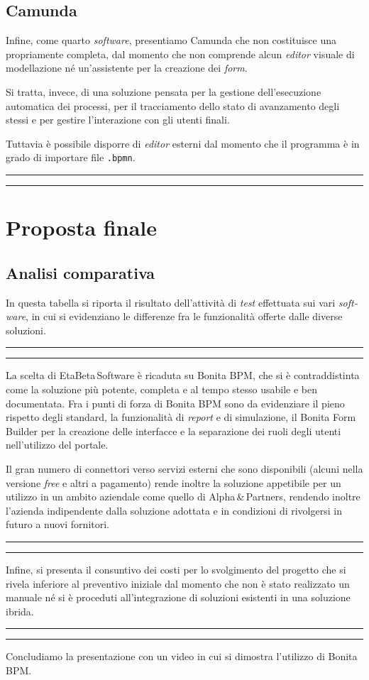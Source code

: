 \documentclass[a4paper,10pt]{article}
\newcommand{\inglese}[1]{\foreignlanguage{english}{\textit{#1}}}
\newcommand{\team}{\textsf{EtaBeta\,Software}\xspace}
\newcommand{\sw}{\inglese{software}\xspace}
\newcommand{\customer}{\textsf{Alpha\,\&\,Partners}\xspace}
\newcommand{\cambioslide}{%
\begin{center}
\Large
\rule[4pt]{0.2\linewidth}{.7pt} \ding{167} \rule[4pt]{0.2\linewidth}{.7pt}
\end{center}
}
\begin{document}
\subsection{Camunda}
Infine, come quarto \sw, presentiamo Camunda che non costituisce una propriamente completa, dal momento che non comprende alcun \inglese{editor} visuale di modellazione né un'assistente per la creazione dei \inglese{form}.

Si tratta, invece, di una soluzione pensata per la gestione dell'esecuzione automatica dei processi, per il tracciamento dello stato di avanzamento degli stessi e per gestire l'interazione con gli utenti finali.

Tuttavia è possibile disporre di \inglese{editor} esterni dal momento che il programma è in grado di importare file \texttt{.bpmn}.

\cambioslide

\section{Proposta finale}

\subsection{Analisi comparativa}
In questa tabella si riporta il risultato dell'attività di \inglese{test} effettuata sui vari \sw, in cui si evidenziano le differenze fra le funzionalità offerte dalle diverse soluzioni.

\cambioslide

La scelta di \team è ricaduta su Bonita BPM, che si è contraddistinta come la soluzione più potente, completa e al tempo stesso usabile e ben documentata. Fra i punti di forza di Bonita BPM sono da evidenziare il pieno rispetto degli standard, la funzionalità di \inglese{report} e di simulazione, il Bonita Form Builder per la creazione delle interfacce e la separazione dei ruoli degli utenti nell'utilizzo del portale.

Il gran numero di connettori verso servizi esterni che sono disponibili (alcuni nella versione \inglese{free} e altri a pagamento) rende inoltre la soluzione appetibile per un utilizzo in un ambito aziendale come quello di \customer, rendendo inoltre l'azienda indipendente dalla soluzione adottata e in condizioni di rivolgersi in futuro a nuovi fornitori.

\cambioslide

Infine, si presenta il consuntivo dei costi per lo svolgimento del progetto che si rivela inferiore al preventivo iniziale dal momento che non è stato realizzato un manuale né si è proceduti all'integrazione di soluzioni esistenti in una soluzione ibrida.

\cambioslide

Concludiamo la presentazione con un video in cui si dimostra l'utilizzo di Bonita BPM.
\end{document}
